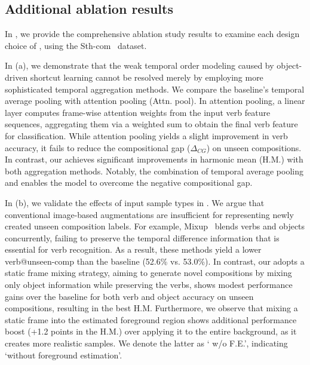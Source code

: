 \subsection{Additional ablation results}
In , we provide the comprehensive ablation study results to examine each design choice of \ours{}, using the Sth-com~\cite{li2024c2c} dataset. 

In  (a), we demonstrate that the weak temporal order modeling caused by object-driven shortcut learning cannot be resolved merely by employing more sophisticated temporal aggregation methods. 
We compare the baseline's temporal average pooling with attention pooling (Attn. pool). In attention pooling, a linear layer computes frame-wise attention weights from the input verb feature sequences, aggregating them via a weighted sum to obtain the final verb feature for classification. 
While attention pooling yields a slight improvement in verb accuracy, it fails to reduce the compositional gap ($\Delta_{CG}$) on unseen compositions. 
In contrast, our \torc{} achieves significant improvements in harmonic mean (H.M.) with both aggregation methods. 
Notably, the combination of temporal average pooling and \torc{} enables the model to overcome the negative compositional gap.



In  (b), we validate the effects of input sample types in \cpr{}.
We argue that conventional image-based augmentations are insufficient for representing newly created unseen composition labels. 
For example, Mixup~\cite{zhang2018mixup} blends verbs and objects concurrently, failing to preserve the temporal difference information that is essential for verb recognition.
As a result, these methods yield a lower verb@unseen-comp than the baseline (52.6\% vs. 53.0\%).
In contrast, our \cpr{} adopts a static frame mixing strategy, aiming to generate novel compositions by mixing only object information while preserving the verbs, shows modest performance gains over the baseline for both verb  and object accuracy on unseen compositions, resulting in the best H.M. 
Furthermore, we observe that mixing a static frame into the estimated foreground region shows additional  performance boost (+1.2 points in the H.M.) over applying it to the entire background, as it creates more realistic samples.
We denote the latter as `\cpr{} w/o F.E.', indicating `without foreground estimation'.



